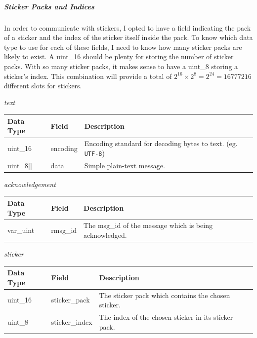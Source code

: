 \documentclass{article}
\begin{document}
\newpage

\subparagraph{Sticker Packs and Indices}
In order to communicate with stickers, I opted to have a field indicating the pack of a sticker and the index of the sticker itself inside the pack. To know which data type to use for each of these fields, I need to know how many sticker packs are likely to exist. A uint\_16 should be plenty for storing the number of sticker packs. With so many sticker packs, it makes sense to have a uint\_8 storing a sticker's index. This combination will provide a total of $2^{16} \times 2^8 = 2^{24} = 16777216$ different slots for stickers.

\vspace{0.5cm}

\begin{center}
\Large{\textit{text}}
\begin{table}[H]
\centering
\begin{tabular}{|p{1.3cm}|p{2.5cm}|p{6cm}|}
\hline
\rowcolor{tblgrey} 
Data Type       & Field           & Description                                               \\ \hline
uint\_16        & encoding        & Encoding standard for decoding bytes to text. (eg. \texttt{UTF-8}) \\ \hline
uint\_8[\hspace{0.05cm}] & data            & Simple plain-text message.                                \\ \hline
\end{tabular}
\end{table}

\Large{\textit{acknowledgement}}
\begin{table}[H]
\centering
\begin{tabular}{|p{1.3cm}|p{2.5cm}|p{6cm}|}
\hline
\rowcolor{tblgrey} 
Data Type       & Field           & Description                                               \\ \hline
var\_uint       & rmsg\_id         & The msg\_id of the message which is being acknowledged.   \\ \hline
\end{tabular}
\end{table}

\Large{\textit{sticker}}
\begin{table}[H]
\centering
\begin{tabular}{|p{1.3cm}|p{2.5cm}|p{6cm}|}
\hline
\rowcolor{tblgrey} 
Data Type       & Field           & Description                                               \\ \hline
uint\_16        & sticker\_pack   & The sticker pack which contains the chosen sticker.       \\ \hline
uint\_8         & sticker\_index  & The index of the chosen sticker in its sticker pack.      \\ \hline
\end{tabular}
\end{table}


\end{center}
\end{document}
